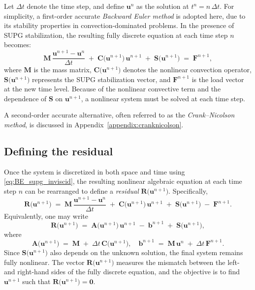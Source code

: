 Let \(\Delta t\) denote the time step, and define \(\mathbf{u}^n\) as the solution at \(t^n = n\,\Delta t\). For simplicity, a first-order accurate \textit{Backward Euler method} is adopted here, due to its stability properties in convection-dominated problems. In the presence of SUPG stabilization, the resulting fully discrete equation at each time step \(n\) becomes:
\begin{equation}
\mathbf{M} \,\frac{\mathbf{u}^{n+1} - \mathbf{u}^n}{\Delta t}
\;+\;
\mathbf{C}\bigl(\mathbf{u}^{n+1}\bigr)\,\mathbf{u}^{n+1}
\;+\;
\mathbf{S}\bigl(\mathbf{u}^{n+1}\bigr)
\;=\;
\mathbf{F}^{n+1},
\label{eq:BE_supg_inviscid}
\end{equation}
where \(\mathbf{M}\) is the mass matrix, \(\mathbf{C}\bigl(\mathbf{u}^{n+1}\bigr)\) denotes the nonlinear convection operator, \(\mathbf{S}\bigl(\mathbf{u}^{n+1}\bigr)\) represents the SUPG stabilization vector, and \(\mathbf{F}^{n+1}\) is the load vector at the new time level. Because of the nonlinear convective term and the dependence of \(\mathbf{S}\) on \(\mathbf{u}^{n+1}\), a nonlinear system must be solved at each time step.

A second-order accurate alternative, often referred to as the \textit{Crank--Nicolson method}, is discussed in Appendix~\ref{appendix:cranknicolson}.

\subsection{Defining the residual}

Once the system is discretized in both space and time using \eqref{eq:BE_supg_inviscid}, the resulting nonlinear algebraic equation at each time step \(n\) can be rearranged to define a \textit{residual} 
\(\mathbf{R}\bigl(\mathbf{u}^{n+1}\bigr)\). Specifically,
\begin{equation}
\mathbf{R}\bigl(\mathbf{u}^{n+1}\bigr) 
\;=\;
\mathbf{M}\,\frac{\mathbf{u}^{n+1} - \mathbf{u}^n}{\Delta t} 
\;+\;
\mathbf{C}\bigl(\mathbf{u}^{n+1}\bigr)\,\mathbf{u}^{n+1} 
\;+\;
\mathbf{S}\bigl(\mathbf{u}^{n+1}\bigr)
\;-\;
\mathbf{F}^{n+1}.
\label{eq:R_supg_inviscid}
\end{equation}
Equivalently, one may write
\begin{equation}
\mathbf{R}\bigl(\mathbf{u}^{n+1}\bigr) 
\;=\;
\mathbf{A}\bigl(\mathbf{u}^{n+1}\bigr)\,\mathbf{u}^{n+1} 
\;-\;
\mathbf{b}^{n+1}
\;+\;
\mathbf{S}\bigl(\mathbf{u}^{n+1}\bigr),
\label{eq:R_full_inviscid}
\end{equation}
where 
\begin{equation}
\mathbf{A}\bigl(\mathbf{u}^{n+1}\bigr) 
\;=\;
\mathbf{M} 
\;+\;
\Delta t\,\mathbf{C}\bigl(\mathbf{u}^{n+1}\bigr),
\quad
\mathbf{b}^{n+1} 
\;=\;
\mathbf{M}\,\mathbf{u}^n 
\;+\;
\Delta t\,\mathbf{F}^{n+1}.
\end{equation}
Since \(\mathbf{S}\bigl(\mathbf{u}^{n+1}\bigr)\) also depends on the unknown solution, the final system remains fully nonlinear. The vector \(\mathbf{R}\bigl(\mathbf{u}^{n+1}\bigr)\) measures the mismatch between the left- and right-hand sides of the fully discrete equation, and the objective is to find \(\mathbf{u}^{n+1}\) such that 
\(\mathbf{R}\bigl(\mathbf{u}^{n+1}\bigr) = \boldsymbol{0}\).

